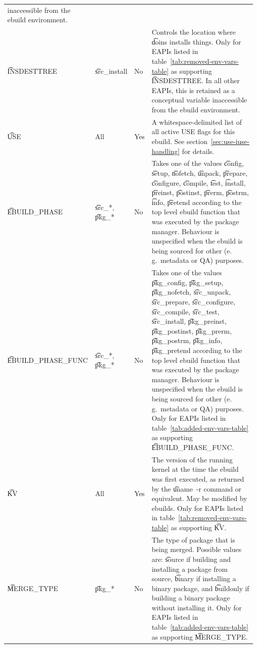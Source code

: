\begin{landscape}
\begin{longtable}{l P{7em} l p{\mycolwidth}}
    inaccessible from the ebuild environment. \\
\t{INSDESTTREE} &
    \t{src_install} &
    No &
     Controls the location where \t{doins} installs things. Only for EAPIs
    listed in table~\ref{tab:removed-env-vars-table} as supporting \t{INSDESTTREE}\@. In all other
    EAPIs, this is retained as a conceptual variable inaccessible from the ebuild environment. \\
\t{USE} &
    All &
    Yes &
    A whitespace-delimited list of all active USE flags for this ebuild. See
    section~\ref{sec:use-iuse-handling} for details. \\
\t{EBUILD_PHASE} &
    \t{src_*}, \t{pkg_*} &
    No &
    Takes one of the values \t{config}, \t{setup}, \t{nofetch}, \t{unpack}, \t{prepare},
    \t{configure}, \t{compile}, \t{test}, \t{install}, \t{preinst}, \t{postinst}, \t{prerm},
    \t{postrm}, \t{info}, \t{pretend} according to the top level ebuild function that was executed
    by the package manager. Behaviour is unspecified when the ebuild is being sourced for other
    (e.\,g.\ metadata or QA) purposes. \\
\t{EBUILD_PHASE_FUNC} &
    \t{src_*}, \t{pkg_*} &
    No &
     Takes one of the values \t{pkg_config}, \t{pkg_setup},
    \t{pkg_nofetch}, \t{src_unpack}, \t{src_prepare}, \t{src_configure}, \t{src_compile},
    \t{src_test}, \t{src_install}, \t{pkg_preinst}, \t{pkg_postinst}, \t{pkg_prerm},
    \t{pkg_postrm}, \t{pkg_info}, \t{pkg_pretend} according to the top level ebuild function that
    was executed by the package manager. Behaviour is unspecified when the ebuild is being sourced
    for other (e.\,g.\ metadata or QA) purposes. Only for EAPIs listed in
    table~\ref{tab:added-env-vars-table} as supporting \t{EBUILD_PHASE_FUNC}. \\
\t{KV} &
    All &
    Yes &
     The version of the running kernel at the time the ebuild was first executed,
    as returned by the \t{uname~-r} command or equivalent.  May be modified by ebuilds.  Only for
    EAPIs listed in table~\ref{tab:removed-env-vars-table} as supporting \t{KV}. \\
\t{MERGE_TYPE} &
    \t{pkg_*} &
    No &
     The type of package that is being merged. Possible values are:
    \t{source} if building and installing a package from source, \t{binary} if installing a binary
    package, and \t{buildonly} if building a binary package without installing it. Only for EAPIs
    listed in table~\ref{tab:added-env-vars-table} as supporting \t{MERGE_TYPE}. \\

\end{longtable}
\end{landscape}
